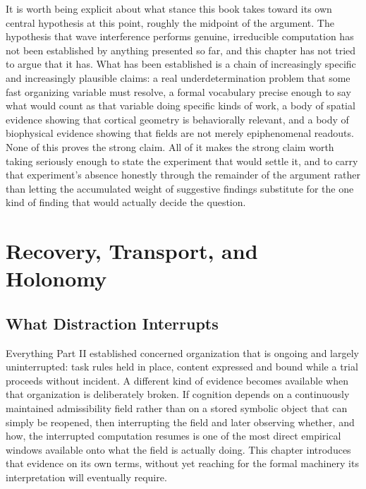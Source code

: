 \documentclass[11pt]{book}
\begin{document}
It is worth being explicit about what stance this book takes toward its own central hypothesis at this point, roughly the midpoint of the argument. The hypothesis that wave interference performs genuine, irreducible computation has not been established by anything presented so far, and this chapter has not tried to argue that it has. What has been established is a chain of increasingly specific and increasingly plausible claims: a real underdetermination problem that some fast organizing variable must resolve, a formal vocabulary precise enough to say what would count as that variable doing specific kinds of work, a body of spatial evidence showing that cortical geometry is behaviorally relevant, and a body of biophysical evidence showing that fields are not merely epiphenomenal readouts. None of this proves the strong claim. All of it makes the strong claim worth taking seriously enough to state the experiment that would settle it, and to carry that experiment's absence honestly through the remainder of the argument rather than letting the accumulated weight of suggestive findings substitute for the one kind of finding that would actually decide the question.

\part{Recovery, Transport, and Holonomy}

\chapter{What Distraction Interrupts}

Everything Part II established concerned organization that is ongoing and largely uninterrupted: task rules held in place, content expressed and bound while a trial proceeds without incident. A different kind of evidence becomes available when that organization is deliberately broken. If cognition depends on a continuously maintained admissibility field rather than on a stored symbolic object that can simply be reopened, then interrupting the field and later observing whether, and how, the interrupted computation resumes is one of the most direct empirical windows available onto what the field is actually doing. This chapter introduces that evidence on its own terms, without yet reaching for the formal machinery its interpretation will eventually require.
\end{document}
